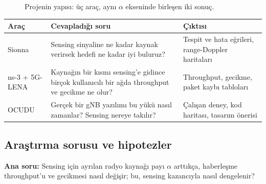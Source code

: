 \begin{figure}[H]
\centering
{}
\caption{Projenin yapısı: üç araç, aynı $\alpha$ ekseninde birleşen iki sonuç.}
\label{fig:boru}
\end{figure}

\begingroup\sffamily\small
\begin{xltabular}{\textwidth}{@{}p{2.6cm}Xp{4.2cm}@{}}
\toprule
\textbf{Araç} & \textbf{Cevapladığı soru} & \textbf{Çıktısı} \\
\midrule
Sionna & Sensing sinyaline ne kadar kaynak verirsek hedefi ne kadar iyi buluruz? & Tespit ve hata eğrileri, range-Doppler haritaları \\
ns-3 + 5G-LENA & Kaynağın bir kısmı sensing'e gidince birçok kullanıcılı bir ağda throughput ve gecikme ne olur? & Throughput, gecikme, paket kaybı tabloları \\
OCUDU & Gerçek bir gNB yazılımı bu yükü nasıl zamanlar? Sensing nereye takılır? & Çalışan deney, kod haritası, tasarım önerisi \\
\bottomrule
\end{xltabular}
\endgroup

\subsection{Araştırma sorusu ve hipotezler}

\textbf{Ana soru:} Sensing için ayrılan radyo kaynağı payı $\alpha$ arttıkça, haberleşme throughput'u ve gecikmesi nasıl değişir; bu, sensing kazancıyla nasıl dengelenir?

